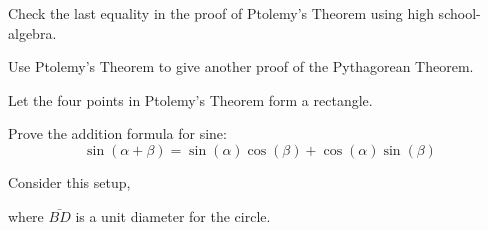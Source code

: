 \documentclass{ximera}
\begin{document}
\begin{problem}
Check the last equality in the proof of Ptolemy's Theorem using high
school-algebra.
\begin{freeResponse}
\end{freeResponse}
\end{problem}

\begin{problem}
Use Ptolemy's Theorem to give another proof of the Pythagorean Theorem.
\begin{hint}
Let the four points in Ptolemy's Theorem form a rectangle.
\end{hint}
\begin{freeResponse}
\end{freeResponse}
\end{problem}


\begin{problem}
Prove the addition formula for sine:
\[
\sin(\alpha + \beta) = \sin(\alpha)\cos(\beta) +
\cos(\alpha)\sin(\beta)
\]
\begin{hint}
Consider this setup, 
\begin{image}
\end{image}
where $\bar{BD}$ is a unit diameter for the circle.
\end{hint}
\end{problem}
\end{document}
